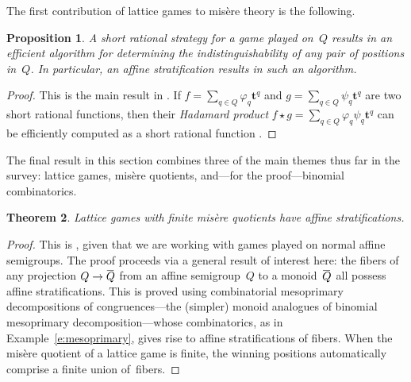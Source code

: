 \documentclass[12pt]{amsart}
\numberwithin{equation}{section}
\newtheorem{thm}{Theorem}[section]
\newtheorem{prop}[thm]{Proposition}
\theoremstyle{definition}
\begin{document}
The first contribution of lattice games to mis\`ere theory is the
following.

\begin{prop}
A short rational strategy for a game played on~$Q$ results in an
efficient algorithm for determining the indistinguishability of any
pair of positions in~$Q$.  In particular, an affine stratification
results in such an algorithm.
\end{prop}
\begin{proof}
This is the main result in \cite[\S6]{algsCGT}.  If $f = \sum_{q \in
Q} {\varphi}_q{\mathbf{t}}^q$ and $g = \sum_{q \in Q} \psi_q{\mathbf{t}}^q$ are two short
rational functions, then their \emph{Hadamard product} $f \star g =
\sum_{q \in Q} {\varphi}_q\psi_q{\mathbf{t}}^q$ can be efficiently computed as a
short rational function \cite{bw03}.
\end{proof}

The final result in this section combines three of the main themes
thus far in the survey: lattice games, mis\`ere quotients, and---for
the proof---binomial combinatorics.

\begin{thm}\label{t:misere}
Lattice games with finite mis\`ere quotients have affine
stratifications.
\end{thm}
\begin{proof}
This is \cite[Corollary~4.5]{affineStrat}, given that we are working
with games played on normal affine semigroups.  The proof proceeds via
a general result \cite[Theorem~3.1]{affineStrat} of interest here: the
fibers of any projection $Q \to {\hspace{.15ex}{{\overline{{\hspace{-.15ex}Q\hspace{-.25ex}}}}{}}\hspace{.25ex}}$ from an affine semigroup~$Q$ to a
monoid~${\hspace{.15ex}{{\overline{{\hspace{-.15ex}Q\hspace{-.25ex}}}}{}}\hspace{.25ex}}$ all possess affine stratifications.  This is proved using
combinatorial mesoprimary decompositions of congruences---the
(simpler) monoid analogues of binomial mesoprimary
decomposition---whose combinatorics, as in
Example~\ref{e:mesoprimary}, gives rise to affine stratifications of
fibers.  When the mis\`ere quotient of a lattice game is finite, the
winning positions automatically comprise a finite union of~fibers.
\end{proof}
\end{document}
